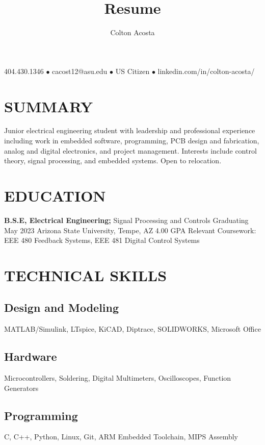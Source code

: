 \documentclass{article}
\makeatletter
\renewcommand{\maketitle}{
	\begin{center}
		{\huge\bfseries
			\theauthor}
			
		404.430.1346 $\bullet$ cacost12@asu.edu $\bullet$ US Citizen $\bullet$ linkedin.com/in/colton-acosta/
	\end{center}
}
\makeatother
\begin{document}
\title{Resume}
\author{Colton Acosta}
\maketitle
\section{SUMMARY}
Junior electrical engineering student with leadership and professional experience including work in embedded software, programming, PCB design and fabrication, analog and digital electronics, and project management. Interests include control theory, signal processing, and embedded systems. Open to relocation.
\section{EDUCATION}
\textbf{B.S.E, Electrical Engineering;} Signal Processing and Controls
\hfill 
Graduating May 2023
\linebreak
Arizona State University, Tempe, AZ 
\hfill
4.00 GPA
\linebreak 
Relevant Coursework: EEE 480 Feedback Systems, EEE 481 Digital Control Systems

\section{TECHNICAL SKILLS}
\subsection{Design and Modeling}
MATLAB/Simulink, LTspice, KiCAD, Diptrace, SOLIDWORKS, Microsoft Office
\subsection{Hardware}
Microcontrollers, Soldering, Digital Multimeters, Oscilloscopes, Function Generators
\subsection{Programming} 
C, C++, Python, Linux, Git, ARM Embedded Toolchain, MIPS Assembly
\end{document}
